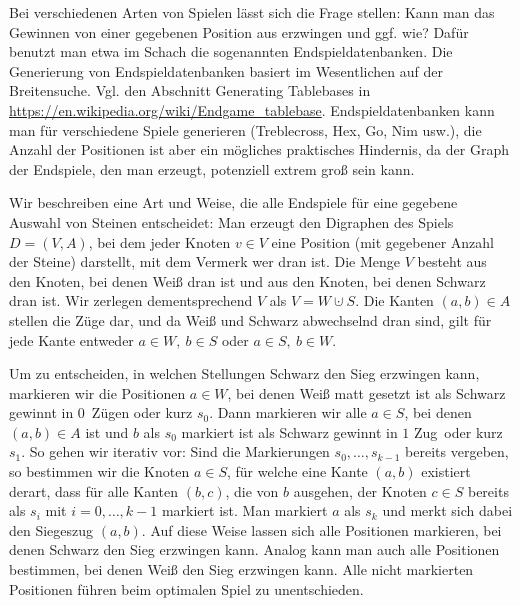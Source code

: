 \begin{bem}  		
		Bei verschiedenen Arten von Spielen lässt sich die Frage stellen: Kann man das Gewinnen von einer gegebenen Position aus erzwingen und ggf. wie? Dafür benutzt man etwa im Schach die sogenannten Endspieldatenbanken. 
		Die Generierung von Endspieldatenbanken basiert im Wesentlichen auf der Breitensuche. Vgl. den Abschnitt Generating Tablebases in \url{https://en.wikipedia.org/wiki/Endgame_tablebase}. Endspieldatenbanken kann man für verschiedene Spiele generieren (Treblecross, Hex, Go, Nim usw.), die Anzahl der Positionen ist aber ein mögliches praktisches Hindernis, da der Graph der Endspiele, den man erzeugt, potenziell extrem groß sein kann.   

\condclearpage

		Wir beschreiben eine Art und Weise, die alle Endspiele für eine gegebene Auswahl von Steinen entscheidet: Man erzeugt den Digraphen des Spiels $D=(V,A)$, bei dem jeder Knoten $v \in V$ eine Position (mit gegebener Anzahl der Steine) darstellt, mit dem Vermerk wer dran ist. Die Menge $V$ besteht aus den Knoten, bei denen Weiß dran ist und aus den Knoten, bei denen Schwarz dran ist. Wir zerlegen dementsprechend $V$ als $V = W \cupdot S$. Die Kanten $(a,b) \in A $ stellen die Züge dar, und da Weiß und Schwarz abwechselnd dran sind, gilt für jede Kante entweder  $a \in W,\ b \in S$ oder $a \in S,\ b \in W$. 
		
		Um zu entscheiden, in welchen Stellungen Schwarz den Sieg erzwingen kann, markieren wir die Positionen $a \in W$, bei denen Weiß matt gesetzt ist als \glqq Schwarz gewinnt in $0$\grqq\ Zügen oder kurz $s_0$. Dann markieren wir alle $a \in S$, bei denen $(a,b) \in A$ ist und $b$ als $s_0$ markiert ist als \glqq Schwarz gewinnt in $1$ Zug\grqq\ oder kurz $s_1$. So gehen wir iterativ vor: Sind die Markierungen $s_0,\ldots,s_{k-1}$ bereits vergeben, so bestimmen wir die Knoten $a \in S$, für welche eine Kante $(a,b)$ existiert derart, dass für alle Kanten $(b,c)$, die von $b$ ausgehen, der Knoten $c \in S$ bereits als $s_i$ mit $i=0,\ldots,k-1$ markiert ist. Man markiert $a$ als $s_k$ und merkt sich dabei den Siegeszug $(a,b)$. Auf diese Weise lassen sich alle Positionen markieren, bei denen Schwarz den Sieg erzwingen kann. Analog kann man auch alle Positionen bestimmen, bei denen Weiß den Sieg erzwingen kann.
		Alle nicht markierten Positionen führen beim optimalen Spiel zu unentschieden. 
\end{bem} 

